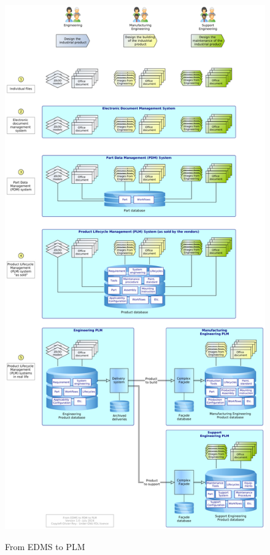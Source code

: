 \documentclass[]{article}
\begin{document}
\begin{figure}[t]
\caption{From EDMS to PLM}
\includegraphics[height=\textheight]{steps-to-plm.png}
\label{fig:to-plm}
\end{figure}
\end{document}
